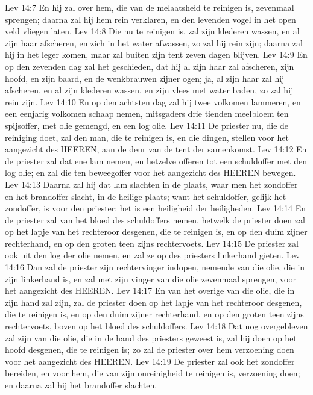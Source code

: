 Lev 14:7  En hij zal over hem, die van de melaatsheid te reinigen is, zevenmaal sprengen; daarna zal hij hem rein verklaren, en den levenden vogel in het open veld vliegen laten.
Lev 14:8  Die nu te reinigen is, zal zijn klederen wassen, en al zijn haar afscheren, en zich in het water afwassen, zo zal hij rein zijn; daarna zal hij in het leger komen, maar zal buiten zijn tent zeven dagen blijven.
Lev 14:9  En op den zevenden dag zal het geschieden, dat hij al zijn haar zal afscheren, zijn hoofd, en zijn baard, en de wenkbrauwen zijner ogen; ja, al zijn haar zal hij afscheren, en al zijn klederen wassen, en zijn vlees met water baden, zo zal hij rein zijn.
Lev 14:10  En op den achtsten dag zal hij twee volkomen lammeren, en een eenjarig volkomen schaap nemen, mitsgaders drie tienden meelbloem ten spijsoffer, met olie gemengd, en een log olie.
Lev 14:11  De priester nu, die de reiniging doet, zal den man, die te reinigen is, en die dingen, stellen voor het aangezicht des HEEREN, aan de deur van de tent der samenkomst.
Lev 14:12  En de priester zal dat ene lam nemen, en hetzelve offeren tot een schuldoffer met den log olie; en zal die ten beweegoffer voor het aangezicht des HEEREN bewegen.
Lev 14:13  Daarna zal hij dat lam slachten in de plaats, waar men het zondoffer en het brandoffer slacht, in de heilige plaats; want het schuldoffer, gelijk het zondoffer, is voor den priester; het is een heiligheid der heiligheden.
Lev 14:14  En de priester zal van het bloed des schuldoffers nemen, hetwelk de priester doen zal op het lapje van het rechteroor desgenen, die te reinigen is, en op den duim zijner rechterhand, en op den groten teen zijns rechtervoets.
Lev 14:15  De priester zal ook uit den log der olie nemen, en zal ze op des priesters linkerhand gieten.
Lev 14:16  Dan zal de priester zijn rechtervinger indopen, nemende van die olie, die in zijn linkerhand is, en zal met zijn vinger van die olie zevenmaal sprengen, voor het aangezicht des HEEREN.
Lev 14:17  En van het overige van die olie, die in zijn hand zal zijn, zal de priester doen op het lapje van het rechteroor desgenen, die te reinigen is, en op den duim zijner rechterhand, en op den groten teen zijns rechtervoets, boven op het bloed des schuldoffers.
Lev 14:18  Dat nog overgebleven zal zijn van die olie, die in de hand des priesters geweest is, zal hij doen op het hoofd desgenen, die te reinigen is; zo zal de priester over hem verzoening doen voor het aangezicht des HEEREN.
Lev 14:19  De priester zal ook het zondoffer bereiden, en voor hem, die van zijn onreinigheid te reinigen is, verzoening doen; en daarna zal hij het brandoffer slachten.
